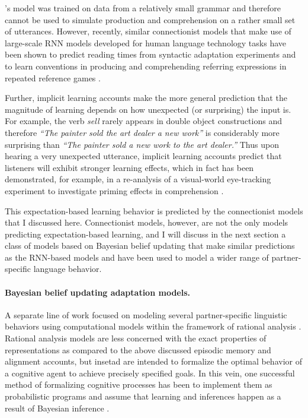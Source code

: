 \citeauthor{Chang2006}'s model was trained on data from a relatively small grammar and therefore cannot be used to simulate production and comprehension on a rather small set
of utterances. However, recently, similar connectionist models that make use of large-scale RNN models developed for human language technology 
tasks have been shown to predict reading times from syntactic adaptation experiments \cite{VanSchijndel2018} and to learn conventions in producing and comprehending 
referring expressions in repeated reference games \cite{Hawkins2019}. 

Further, implicit learning accounts make the more general prediction that the magnitude of learning depends on how unexpected (or surprising) the input is. For example, the verb \textit{sell} 
rarely appears in  double object constructions and therefore \textit{``The painter sold the art dealer a new work''} is considerably more surprising than \textit{``The painter sold  a new work to 
the art dealer.''} Thus upon hearing a very unexpected utterance, implicit learning accounts predict that listeners will exhibit stronger learning effects, which in fact has been demonstrated, 
for example, in a re-analysis of a visual-world eye-tracking experiment to investigate priming effects in comprehension \cite{Thothathiri2008,Jaeger2013}. 

This expectation-based learning behavior is predicted by the connectionist models that I discussed here. Connectionist models, however, are not the only models predicting expectation-based learning, and I will discuss in the next section a class of models based on Bayesian belief updating that make similar predictions as the RNN-based models and have been used to model a wider range of partner-specific language behavior.

\paragraph{Bayesian belief updating adaptation models.} A separate line of work focused on modeling several partner-specific linguistic behaviors using computational models within 
the framework of rational analysis \cite{Marr1982,Anderson1990}. Rational analysis models are less concerned with the exact properties of representations as 
compared to the above discussed episodic memory and alignment accounts, but insetad are intended to formalize the optimal behavior of a cognitive agent to achieve 
precisely specified goals. In this vein, one successful method of formalizing cognitive processes has been to implement them as probabilistic programs and assume that learning
and inferences happen as a result of Bayesian inference . 

